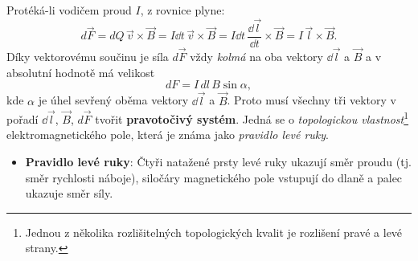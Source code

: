       Protéká-li vodičem proud \(I\), z rovnice plyne:
      \begin{equation}\label{ES:eq_zakl_elm85}
        d\vec{F} =  dQ\,\vec{v}\times\vec{B} 
                 = I\dd{t}\,\vec{v}\times\vec{B} 
                 = I\dd{t}\,\frac{\dd{\vec{l}}}{\dd{t}}\times\vec{B}
                 = I\,\vec{l}\times\vec{B}.
      \end{equation}
      Díky vektorovému součinu je síla \(d\vec{F}\) vždy \emph{kolmá} na oba vektory \(\dd{\vec{l}}\) a 
      \(\vec{B}\) a v absolutní hodnotě má velikost
      \begin{equation}\label{ES:eq_zakl_elm86}
              dF=I\,dl\,B\sin\alpha,
      \end{equation}
      kde \(\alpha\) je úhel sevřený oběma vektory \(\dd{\vec{l}}\) a \(\vec{B}\). Proto musí všechny 
      tři vektory v pořadí \(\dd{\vec{l}}\), \(\vec{B}\), \(d\vec{F}\) tvořit \textbf{pravotočivý 
      systém}. Jedná se o \emph{topologickou vlastnost}\footnote{Jednou z několika rozlišitelných 
      topologických kvalit je rozlišení pravé a levé strany.} elektromagnetického pole, která je 
      známa jako \emph{pravidlo levé ruky}.
      \begin{itemize}
        \item \textbf{Pravidlo levé ruky}: Čtyři natažené prsty levé ruky ukazují směr proudu (tj. 
              směr rychlosti náboje), siločáry magnetického pole vstupují do dlaně a palec ukazuje 
              směr síly.
      \end{itemize}

